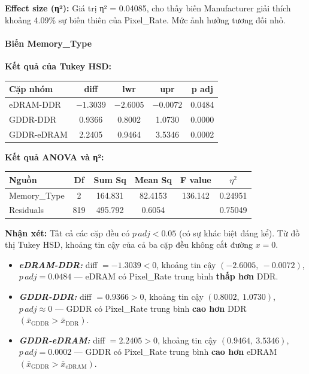 \textbf{Effect size (η²):} Giá trị η² = 0.04085, cho thấy biến Manufacturer giải thích khoảng 4.09\% sự biến thiên của Pixel\_Rate. Mức ảnh hưởng tương đối nhỏ.

\paragraph{Biến Memory\_Type}

\textbf{Kết quả của Tukey HSD:}

\begin{longtable}{|l|c|c|c|c|}
\hline
\textbf{Cặp nhóm} & \textbf{diff} & \textbf{lwr} & \textbf{upr} & \textbf{p adj} \\
\hline
eDRAM-DDR   & $-1.3039$ & $-2.6005$ & $-0.0072$ & 0.0484 \\
\hline
GDDR-DDR    &  0.9366  &  0.8002  &  1.0730  & 0.0000 \\
\hline
GDDR-eDRAM  &  2.2405  &  0.9464  &  3.5346  & 0.0002 \\
\hline
\end{longtable}

\textbf{Kết quả ANOVA và η²:}

\begin{longtable}{|l|c|c|c|c|c|}
\hline
\textbf{Nguồn} & \textbf{Df} & \textbf{Sum Sq} & \textbf{Mean Sq} & \textbf{F value} & \textbf{$\eta^2$} \\
\hline
Memory\_Type & 2 & 164.831 & 82.4153 & 136.142 & 0.24951 \\
\hline
Residuals    & 819 & 495.792 & 0.6054  & & 0.75049 \\
\hline
\end{longtable}

\textbf{Nhận xét:} Tất cả các cặp đều có $p\,adj < 0.05$ (có sự khác biệt đáng kể). Từ đồ thị Tukey HSD, khoảng tin cậy của cả ba cặp đều không cắt đường $x = 0$.
    \begin{itemize}
        \item \textbf{\textit{eDRAM-DDR:}} diff $= -1.3039 < 0$, khoảng tin cậy $(-2.6005,\ -0.0072)$, $p\,adj = 0.0484$ — eDRAM có Pixel\_Rate trung bình \textbf{thấp hơn} DDR.
        \item \textbf{\textit{GDDR-DDR:}} diff $= 0.9366 > 0$, khoảng tin cậy $(0.8002,\ 1.0730)$, $p\,adj \approx 0$ — GDDR có Pixel\_Rate trung bình \textbf{cao hơn} DDR $({\bar{x}}_{\text{GDDR}} > {\bar{x}}_{\text{DDR}})$.
        \item \textbf{\textit{GDDR-eDRAM:}} diff $= 2.2405 > 0$, khoảng tin cậy $(0.9464,\ 3.5346)$, $p\,adj = 0.0002$ — GDDR có Pixel\_Rate trung bình \textbf{cao hơn} eDRAM $({\bar{x}}_{\text{GDDR}} > {\bar{x}}_{\text{eDRAM}})$.
    \end{itemize}
    
